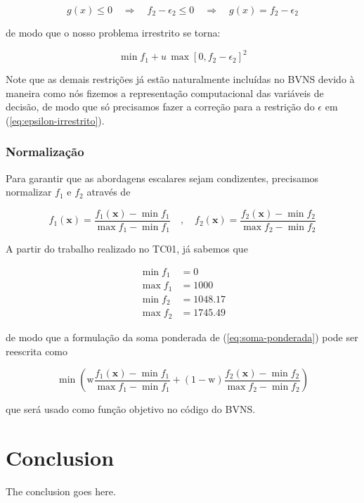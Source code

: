 \documentclass[conference]{IEEEtran}
\begin{document}
\[ g(x) \leq 0 \quad \Longrightarrow \quad f_2 - \epsilon_2 \leq 0 \quad \Longrightarrow \quad g(x) = f_2 - \epsilon_2 \]

\noindent de modo que o nosso problema irrestrito se torna:  


\begin{equation}\label{eq:epsilon-irrestrito}
	\min f_1 + u \, \max \left[ 0, f_2 - \epsilon_2 \right] ^2
\end{equation}

Note que as demais restrições já estão naturalmente incluídas no BVNS devido 
à maneira como nós fizemos a representação computacional das variáveis de decisão, 
de modo que só precisamos fazer a correção para a restrição do $\epsilon$
em (\ref{eq:epsilon-irrestrito}).



\subsubsection{Normalização}

Para garantir que as abordagens escalares sejam condizentes, precisamos normalizar $f_1$ e $f_2$ 
através de 

\begin{equation} \label{eq:normalizacao}
	f_1(\mathbf{x}) = \frac{f_1(\mathbf{x}) - \min f_1}{\max f_1 - \min f_1}
	\quad , \quad 
	f_2(\mathbf{x}) = \frac{f_2(\mathbf{x}) - \min f_2}{\max f_2 - \min f_2}       
\end{equation}

A partir do trabalho realizado no TC01, já sabemos que 


\begin{align}
\min f_1 &= 0 \\
\max f_1 &= 1000 \\
\min f_2 &= 1048.17 \\
\max f_2 &= 1745.49
\end{align}


\noindent de modo que a formulação da soma ponderada de (\ref{eq:soma-ponderada})
pode ser reescrita como  

\[ \min \left( \mathrm{w}\frac{f_1(\mathbf{x}) - \min f_1}{\max f_1 - \min f_1} 
+ (1-\mathrm{w})\frac{f_2(\mathbf{x}) - \min f_2}{\max f_2 - \min f_2}\right)    \]   


\noindent que será usado como função objetivo no código do BVNS.

\section{Conclusion}
The conclusion goes here.


\end{document}
